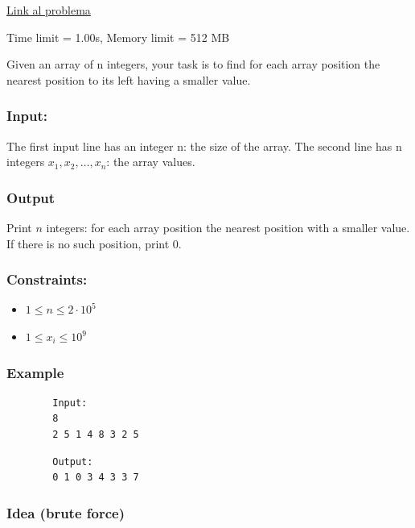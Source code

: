 	\href{https://cses.fi/alon/task/1645/}{Link al problema} 
	
	\smallskip
	
	\noindent Time limit = 1.00s, Memory limit = 512 MB
	
	\bigskip
	
	Given an array of n integers, your task is to find for each array position the nearest position to its left having a smaller value.
	
	\subsubsection*{Input:}
	The first input line has an integer n: the size of the array.
	The second line has n integers $x_1,x_2,\dots,x_n$: the array values.
	
	\subsubsection*{Output}
	Print $n$ integers: for each array position the nearest position with a smaller value. If there is no such position, print 0.
	
	\subsubsection*{Constraints: }
	\begin{itemize}
		
		\item $1 \le n \le 2 \cdot 10^5$
	
		\item $1 \le x_i \le 10^9$
		
	\end{itemize}

	
\subsubsection*{Example} 
	
	\begin{verbatim}
		Input: 
		8
		2 5 1 4 8 3 2 5
	\end{verbatim}
	
		
	\begin{verbatim}
		Output: 
		0 1 0 3 4 3 3 7
	\end{verbatim}
	
\subsubsection*{Idea (brute force)}
	
